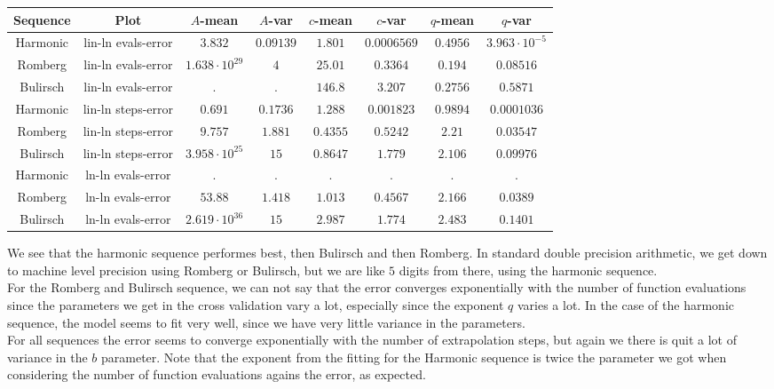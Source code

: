 \begin{table}[H]
    \centering
        \small
    \begin{tabular}{c|c||c|c|c|c|c	|c}
Sequence & Plot & \(A\)-mean & \(A\)-var & \(c\)-mean & \(c\)-var & \(q\)-mean & \(q\)-var\\\hline
Harmonic & lin-ln evals-error & \(3.832\) & \(0.09139\) & \(1.801\) & \(0.0006569\) & \(0.4956\) & \(3.963\cdot 10^{-5}\) \\
Romberg & lin-ln evals-error & \(1.638\cdot 10^{29}\) & \(4\) & \(25.01\) & \(0.3364\) & \(0.194\) & \(0.08516\) \\
Bulirsch & lin-ln evals-error & \(.\) & \(.\) & \(146.8\) & \(3.207\) & \(0.2756\) & \(0.5871\) \\
Harmonic & lin-ln steps-error & \(0.691\) & \(0.1736\) & \(1.288\) & \(0.001823\) & \(0.9894\) & \(0.0001036\) \\
Romberg & lin-ln steps-error & \(9.757\) & \(1.881\) & \(0.4355\) & \(0.5242\) & \(2.21\) & \(0.03547\) \\
Bulirsch & lin-ln steps-error & \(3.958\cdot 10^{25}\) & \(15\) & \(0.8647\) & \(1.779\) & \(2.106\) & \(0.09976\) \\
Harmonic & ln-ln evals-error & . & . & . & . & . & . \\
Romberg & ln-ln evals-error & \(53.88\) & \(1.418\) & \(1.013\) & \(0.4567\) & \(2.166\) & \(0.0389\) \\
Bulirsch & ln-ln evals-error & \(2.619\cdot 10^{36}\) & \(15\) & \(2.987\) & \(1.774\) & \(2.483\) & \(0.1401\) \\
    \end{tabular}
    \label{tab:my_label}
\end{table}

We see that the harmonic sequence performes best, then Bulirsch and then Romberg. In standard double precision arithmetic, we get down to machine level precision using Romberg or Bulirsch, but we are like \(5\) digits from there, using the harmonic sequence.\\

For the Romberg and Bulirsch sequence, we can not say that the error converges exponentially with the number of function evaluations since the parameters we get in the cross validation vary a lot, especially since the exponent \(q\) varies a lot. In the case of the harmonic sequence, the model seems to fit very well, since we have very little variance in the parameters.\\

For all sequences the error seems to converge exponentially with the number of extrapolation steps, but again we there is quit a lot of variance in the \(b\) parameter. Note that the exponent from the fitting for the Harmonic sequence is twice the parameter we got when considering the number of function evaluations agains the error, as expected.\\

